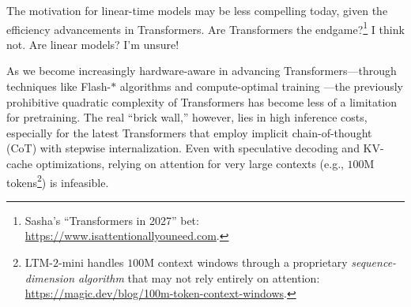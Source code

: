 The motivation for linear-time models may be less compelling today, given the efficiency advancements in Transformers.
%
Are Transformers the endgame?\footnote{Sasha's ``Transformers in 2027'' bet: \url{https://www.isattentionallyouneed.com}.} I think not.
%
Are linear models? I'm unsure!

As we become increasingly hardware-aware in advancing Transformers---through techniques like Flash-$\ast$ algorithms \citep{fu_flashfftconv_2023,shah_flashattention-3_2024} and compute-optimal training \citep{muennighoff_scaling_2023}---the previously prohibitive quadratic complexity of Transformers has become less of a limitation for pretraining.
% 
The real ``brick wall,'' however, lies in high inference costs, especially for the latest Transformers that employ implicit chain-of-thought (CoT) with stepwise internalization.
%
Even with speculative decoding and KV-cache optimizations, relying on attention for very large contexts (e.g., $100$M tokens\footnote{LTM-$2$-mini handles $100$M context windows through a proprietary \textit{sequence-dimension algorithm} that may not rely entirely on attention: \url{https://magic.dev/blog/100m-token-context-windows}.}) is infeasible.

